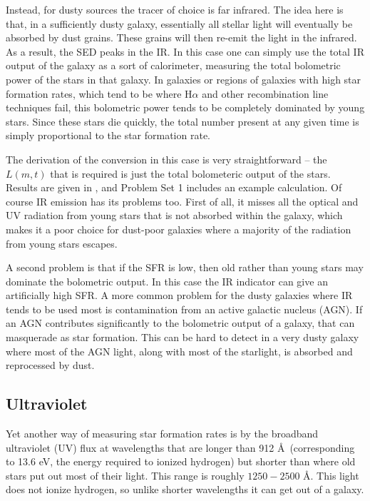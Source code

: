 Instead, for dusty sources the tracer of choice is far infrared. The idea here is that, in a sufficiently dusty galaxy, essentially all stellar light will eventually be absorbed by dust grains. These grains will then re-emit the light in the infrared. As a result, the SED peaks in the IR. In this case one can simply use the total IR output of the galaxy as a sort of calorimeter, measuring the total bolometric power of the stars in that galaxy. In galaxies or regions of galaxies with high star formation rates, which tend to be where H$\alpha$ and other recombination line techniques fail, this bolometric power tends to be completely dominated by young stars. Since these stars die quickly, the total number present at any given time is simply proportional to the star formation rate.

The derivation of the conversion in this case is very straightforward -- the $L(m,t)$ that is required is just the total bolometeric output of the stars. Results are given in \citet{kennicutt12a}, and Problem Set 1 includes an example calculation. Of course IR emission has its problems too. First of all, it misses all the optical and UV radiation from young stars that is not absorbed within the galaxy, which makes it a poor choice for dust-poor galaxies where a majority of the radiation from young stars escapes.

A second problem is that if the SFR is low, then old rather than young stars may dominate the bolometric output. In this case the IR indicator can give an artificially high SFR. A more common problem for the dusty galaxies where IR tends to be used most is contamination from an active galactic nucleus (AGN). If an AGN contributes significantly to the bolometric output of a galaxy, that can masquerade as star formation. This can be hard to detect in a very dusty galaxy where most of the AGN light, along with most of the starlight, is absorbed and reprocessed by dust.

\subsection{Ultraviolet}

Yet another way of measuring star formation rates is by the broadband ultraviolet (UV) flux at wavelengths that are longer than 912 \AA\ (corresponding to 13.6 eV, the energy required to ionized hydrogen) but shorter than where old stars put out most of their light. This range is roughly $1250-2500$ \AA. This light does not ionize hydrogen, so unlike shorter wavelengths it can get out of a galaxy.


